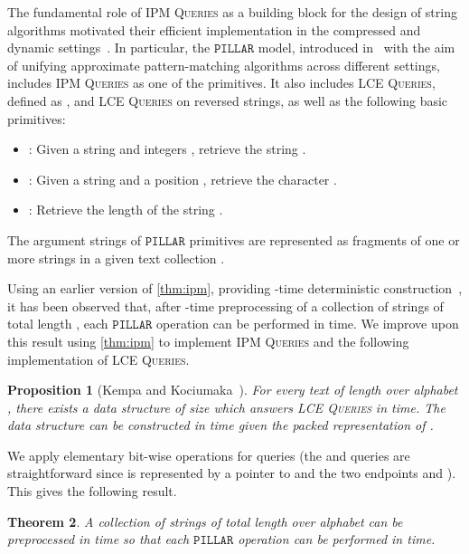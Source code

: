 \documentclass[a4paper]{article}
\newtheorem{theorem}{Theorem}[section]
\newtheorem{proposition}[theorem]{Proposition}
\theoremstyle{definition}
\theoremstyle{remark}
\newcommand{\IPM}{\textsc{IPM Queries}\xspace}
\newcommand{\LCEQ}{\textsc{LCE Queries}\xspace}
\newcommand{\pillar}{\ensuremath{\mathtt{PILLAR}}\xspace}
\begin{document}
The fundamental role of \IPM as a building block for the design of string algorithms
motivated their efficient implementation in the compressed and dynamic settings~\cite{DBLP:conf/focs/Charalampopoulos20}.
In particular, the \pillar model, introduced in~\cite{DBLP:conf/focs/Charalampopoulos20}
with the aim of unifying approximate pattern-matching algorithms across different settings, includes \IPM as one of the primitives.
It also includes \LCEQ, defined as , and \LCEQ on reversed strings,
as well as the following basic primitives:
\begin{itemize}
  \item : Given a string  and integers , retrieve the string .
  \item : Given a string  and a position , retrieve the character .
  \item : Retrieve the length  of the string .
\end{itemize}
The argument strings of \pillar primitives are represented as fragments of one or more strings in a given text collection .

Using an earlier version of \cref{thm:ipm}, providing -time deterministic construction~\cite{phd}, it has been observed \cite[Theorem 7.2]{DBLP:conf/focs/Charalampopoulos20} that, after -time preprocessing of a collection  of strings of total length ,
each \pillar operation can be performed in  time.
We improve upon this result using \cref{thm:ipm} to implement \IPM and
the following implementation of \LCEQ.
\begin{proposition}[Kempa and Kociumaka~\cite{Kempa2019}]\label{prop:lce}
For every text  of length  over alphabet , there exists a data structure of size  which answers \LCEQ in  time. The data structure can be constructed in  time given the packed representation of .
\end{proposition}

We apply elementary bit-wise operations for  queries
(the  and  queries are straightforward since  is represented by a pointer to  and the two endpoints  and ).
This gives the following result.

\begin{theorem}\label{thm:pillar}
A collection  of strings of total length  over alphabet 
can be preprocessed in  time so that each \pillar operation can be performed in  time.
\end{theorem}
\end{document}
